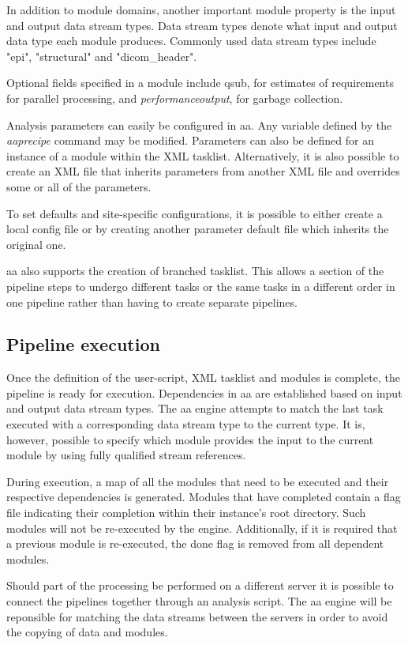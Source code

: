 \documentclass{report}
\begin{document}
    In addition to module domains, another important module property is the
input and output data stream types. Data stream types denote what input and
output data type each module produces. Commonly used data stream
types include "epi", "structural" and "dicom\_header".

    Optional fields specified in a module include qsub, for estimates of
requirements for parallel processing,
and \textit{performanceoutput}, for garbage collection.  

   Analysis parameters can easily be configured in aa. Any variable defined by
the \textit{aaprecipe} command may be modified. Parameters can also be defined
for an instance of a module within the XML tasklist. Alternatively, it is also
possible to create an XML file that inherits parameters from another XML file
and overrides some or all of the parameters.

   To set defaults and site-specific configurations, it is possible to either
create a local config file or by creating another parameter default file which
inherits the original one.   

    aa also supports the creation of branched tasklist. This allows a section of
the pipeline steps to undergo different tasks or the same tasks in a different
order in one pipeline rather than having to create separate pipelines.

        \subsection{Pipeline execution}
        Once the definition of the user-script, XML tasklist and modules is
complete, the pipeline is ready for execution. Dependencies in aa are
established based on input and output data stream types. The aa engine attempts
to match the last task executed with a corresponding data stream type to the
current type. It is, however, possible to specify which module provides the
input to the current module by using fully qualified stream references.

        During execution, a map of all the modules that need to be executed and
their respective dependencies is generated. Modules that have completed contain
a flag file indicating their completion within their instance's root directory. Such
modules will not be re-executed by the engine.
Additionally, if it is required that a previous module is re-executed, the done flag is
removed from all dependent modules.  

        Should part of the processing be performed on a different server it is
possible to connect the pipelines together through an analysis script. The aa engine will be reponsible for
matching the data streams between the servers in order to avoid the copying of
data and modules.
\end{document}
